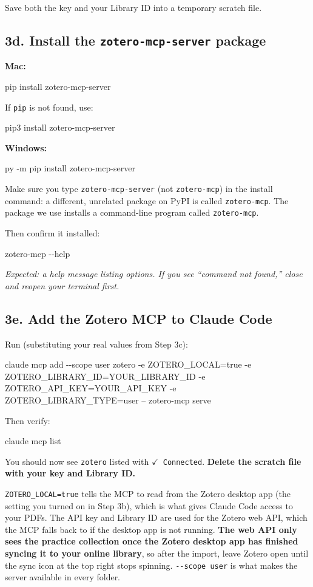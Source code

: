 \documentclass[11pt]{article}
\newcommand{\cmd}[1]{\par\vspace{0.2em}\colorbox{codegray}{\parbox{\dimexpr\linewidth-2\fboxsep}{\ttfamily\small #1}}\par\vspace{0.2em}}
\newcommand{\plat}[1]{{\color{headingblue}\textbf{#1}}}
\begin{document}
Save both the key and your Library ID into a temporary scratch file.

\subsection*{3d. Install the \texttt{zotero-mcp-server} package}

\plat{Mac:}
\cmd{pip install zotero-mcp-server}
If \texttt{pip} is not found, use:
\cmd{pip3 install zotero-mcp-server}

\plat{Windows:}
\cmd{py -m pip install zotero-mcp-server}

Make sure you type \texttt{zotero-mcp-server} (not \texttt{zotero-mcp}) in the install command: a different, unrelated package on PyPI is called \texttt{zotero-mcp}. The package we use installs a command-line program called \texttt{zotero-mcp}.

Then confirm it installed:
\cmd{zotero-mcp -\/-help}

\textit{Expected: a help message listing options. If you see ``command not found,'' close and reopen your terminal first.}

\subsection*{3e. Add the Zotero MCP to Claude Code}

Run (substituting your real values from Step 3c):
\cmd{\footnotesize claude mcp add -\/-scope user zotero -e ZOTERO\_LOCAL=true -e ZOTERO\_LIBRARY\_ID=YOUR\_LIBRARY\_ID -e ZOTERO\_API\_KEY=YOUR\_API\_KEY -e ZOTERO\_LIBRARY\_TYPE=user -- zotero-mcp serve}

Then verify:
\cmd{claude mcp list}

You should now see \texttt{zotero} listed with \texttt{$\checkmark$ Connected}. \textbf{Delete the scratch file with your key and Library ID.}

\texttt{ZOTERO\_LOCAL=true} tells the MCP to read from the Zotero desktop app (the setting you turned on in Step 3b), which is what gives Claude Code access to your PDFs. The API key and Library ID are used for the Zotero web API, which the MCP falls back to if the desktop app is not running. \textbf{The web API only sees the practice collection once the Zotero desktop app has finished syncing it to your online library}, so after the import, leave Zotero open until the sync icon at the top right stops spinning. \texttt{-\/-scope user} is what makes the server available in every folder.
\end{document}
